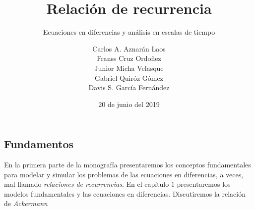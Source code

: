 \documentclass[
	graybox,
	envcountchap,
	sectrefs
]{svmono}
\date{20 de junio del 2019}
\begin{document}
\hypersetup{pageanchor=false}

\author{
	Carlos A. Aznarán Laos\\
	Franss Cruz Ordoñez\\
	Junior Micha Velasque\\
	Gabriel Quiróz Gómez\\
	Davis S. García Fernández
}
\title{Relación de recurrencia}
\subtitle{Ecuaciones en diferencias y análisis en escalas de tiempo}
\maketitle

\frontmatter






\tableofcontents



\hypersetup{pageanchor=true}

\mainmatter
\begingroup
\let\clearpage\relax
\begin{partbacktext}
	\part{Fundamentos}
	En la primera parte de la monografía presentaremos los conceptos fundamentales para modelar y simular los problemas de las ecuaciones en diferencias, a veces, mal llamado \emph{relaciones de recurrencias}. En el capítulo $1$ presentaremos los modelos fundamentales y las ecuaciones en diferencias. Discutiremos la relación de \emph{Ackermann}
\end{partbacktext}

%



\endgroup



%


\backmatter

%
%
\printindex
\end{document}
